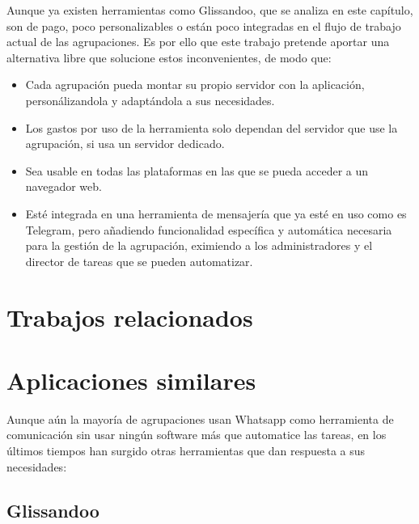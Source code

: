 Aunque ya existen herramientas como Glissandoo, que se analiza en este capítulo, son de pago, poco personalizables o están poco integradas en el flujo de trabajo actual de las agrupaciones. Es por ello que este trabajo pretende aportar una alternativa libre que solucione estos inconvenientes, de modo que:

\begin{itemize}
    \item Cada agrupación pueda montar su propio servidor con la aplicación, personálizandola y adaptándola a sus necesidades.
    \item Los gastos por uso de la herramienta solo dependan del servidor que use la agrupación, si usa un servidor dedicado.
    \item Sea usable en todas las plataformas en las que se pueda acceder a un navegador web.
    \item Esté integrada en una herramienta de mensajería que ya esté en uso como es Telegram, pero añadiendo funcionalidad específica y automática necesaria para la gestión de la agrupación, eximiendo a los administradores y el director de tareas que se pueden automatizar.
\end{itemize}



\section{Trabajos relacionados}

\section{Aplicaciones similares}

Aunque aún la mayoría de agrupaciones usan Whatsapp como herramienta de comunicación sin usar ningún software más que automatice las tareas, en los últimos tiempos han surgido otras herramientas que dan respuesta a sus necesidades:

\subsection{Glissandoo}

